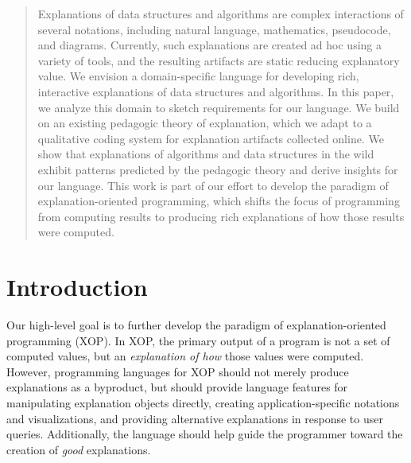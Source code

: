 \documentclass[conference]{IEEEtran}
\begin{document}




\maketitle

\begin{abstract}
Explanations of data structures and algorithms are complex interactions of
several notations, including natural language, mathematics, pseudocode, and
diagrams. Currently, such explanations are created ad hoc using a variety of
tools, and the resulting artifacts are static reducing explanatory value. We
envision a domain-specific language for developing rich, interactive
explanations of data structures and algorithms. In this paper, we analyze this
domain to sketch requirements for our language. We build on an existing
pedagogic theory of explanation, which we adapt to a qualitative coding system
for explanation artifacts collected online. We show that explanations of
algorithms and data structures in the wild exhibit patterns predicted by the
pedagogic theory and derive insights for our language. This work is part of our
effort to develop the paradigm of explanation-oriented programming, which
shifts the focus of programming from computing results to producing rich
explanations of how those results were computed.
\end{abstract}





%
\IEEEpeerreviewmaketitle



\section{Introduction}

Our high-level goal is to further develop the paradigm of explanation-oriented
programming (XOP). In XOP, the primary output of a program is not a set of
computed values, but an \emph{explanation of how} those values were computed.
However, programming languages for XOP should not merely produce explanations
as a byproduct, but should provide language features for manipulating
explanation objects directly, creating application-specific notations and
visualizations, and providing alternative explanations in response to user
queries. Additionally, the language should help guide the programmer toward the
creation of \emph{good} explanations.
\end{document}
